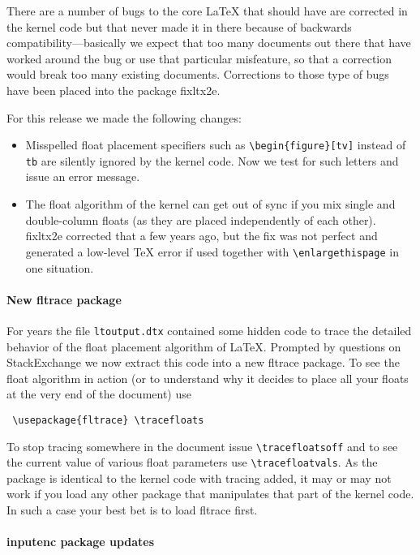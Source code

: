 \documentclass{ltnews}
\begin{document}
There are a number of bugs to the core \LaTeX{} that should have are
corrected in the kernel code but that never made it in there because
of backwards compatibility---basically we expect that too many
documents out there that have worked around the bug or use that
particular misfeature, so that a correction would break too many
existing documents. Corrections to those type of bugs have been placed
into the package \textsf{fixltx2e}.
 

For this release we made the following changes:
\begin{itemize}
\item
   Misspelled float placement specifiers such as
   \verb=\begin{figure}[tv]= instead of \texttt{tb} are silently
   ignored by the kernel code.  Now we test for such letters and issue
   an error message.
\item
   The float algorithm of the kernel can get out of sync if you mix
   single and double-column floats (as they are placed independently
   of each other). \textsf{fixltx2e} corrected that a few years ago,
   but the fix was not perfect and generated a low-level \TeX{} error
   if used together with \verb=\enlargethispage= in one situation.
\end{itemize}




\paragraph{New \textsf{fltrace} package}

For years the file \texttt{ltoutput.dtx} contained some hidden code to
trace the detailed behavior of the float placement algorithm of
\LaTeX. Prompted by questions on StackExchange we now extract this
code into a new \textsf{fltrace} package. To see the float algorithm
in action (or to understand why it decides to place all your floats at
the very end of the document) use
\begin{verbatim}
 \usepackage{fltrace} \tracefloats
\end{verbatim}
To stop tracing somewhere in the document issue
\verb=\tracefloatsoff= and to see the current value of various float
parameters use \verb=\tracefloatvals=. As the package is identical to
the kernel code with tracing added, it may or may not work if you load any
other package that manipulates that part of the kernel code. In such a
case your best bet is to load \textsf{fltrace} first.

\paragraph{\textsf{inputenc} package updates}
\end{document}
